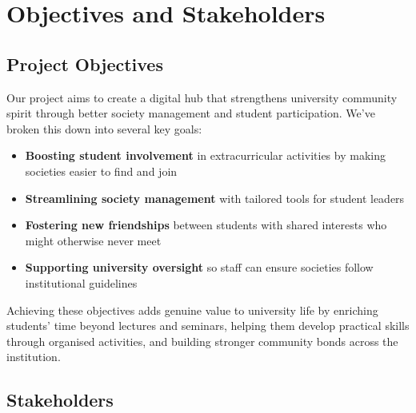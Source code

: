 \chapter{Objectives and Stakeholders}

\section{Project Objectives}

Our project aims to create a digital hub that strengthens university community spirit through better society management and student participation. We've broken this down into several key goals:

\begin{itemize}
    \item \textbf{Boosting student involvement} in extracurricular activities by making societies easier to find and join
    \item \textbf{Streamlining society management} with tailored tools for student leaders
    \item \textbf{Fostering new friendships} between students with shared interests who might otherwise never meet
    \item \textbf{Supporting university oversight} so staff can ensure societies follow institutional guidelines
\end{itemize}

Achieving these objectives adds genuine value to university life by enriching students' time beyond lectures and seminars, helping them develop practical skills through organised activities, and building stronger community bonds across the institution.

\section{Stakeholders}

